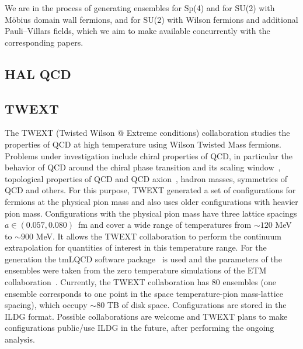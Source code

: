 \documentclass[a4paper,11pt]{article}
\begin{document}
We are in the process of generating ensembles
for Sp(4) 
and for SU(2) 
with Möbius domain wall fermions,
and for SU(2) 
with Wilson fermions
and additional Pauli--Villars fields,
which we aim to make available concurrently with the corresponding papers.



\subsection{HAL QCD}

\subsection{TWEXT}
\begin{linenumbers}[1]
The TWEXT (Twisted Wilson @ Extreme conditions) collaboration studies
the properties of QCD at high temperature using Wilson Twisted Mass
fermions. Problems under investigation include chiral properties of
QCD, in particular the behavior of QCD around the chiral phase
transition and its scaling window~\cite{Kotov:2021rah}, topological
properties of QCD and QCD axion~\cite{Kotov:2021ujj}, hadron masses,
symmetries of QCD and others. For this purpose, TWEXT generated a set
of configurations for  fermions at the physical pion mass
and also uses older configurations with heavier pion
mass. Configurations with the physical pion mass have three lattice
spacings $a\in(0.057,0.080)$~fm and cover a wide range of temperatures
from $\sim120$ MeV to $\sim900$ MeV. It allows the TWEXT collaboration
to perform the continuum extrapolation for quantities of interest in
this temperature range. For the generation the tmLQCD software
package~\cite{Jansen:2009xp,Deuzeman:2013xaa,Abdel-Rehim:2013wba} is
used and the parameters of the ensembles were taken from the zero
temperature simulations of the ETM
collaboration~\cite{Alexandrou:2018egz}. Currently, the TWEXT
collaboration has 80 ensembles (one ensemble corresponds to one point
in the space temperature-pion mass-lattice spacing), which occupy
$\sim80$ TB of disk space. Configurations are stored in the ILDG
format. Possible collaborations are welcome and TWEXT plans to make
configurations public/use ILDG in the future, after performing the
ongoing analysis.
\end{linenumbers}
\end{document}
